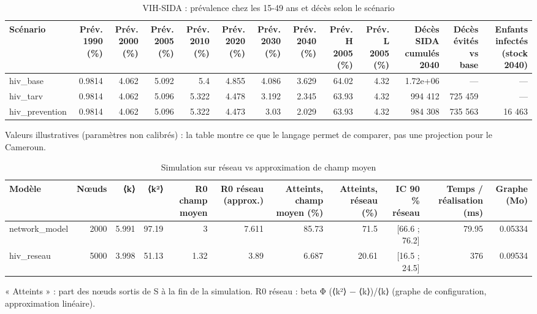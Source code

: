 \begin{table}[htbp]
\centering
\small
\caption{VIH-SIDA : prévalence chez les 15-49 ans et décès selon le scénario}
\label{tab:bench-b4}
\begin{tabular}{lrrrrrrrrrrrr}
\toprule
Scénario & Prév. 1990 (\%) & Prév. 2000 (\%) & Prév. 2005 (\%) & Prév. 2010 (\%) & Prév. 2020 (\%) & Prév. 2030 (\%) & Prév. 2040 (\%) & Prév. H 2005 (\%) & Prév. L 2005 (\%) & Décès SIDA cumulés 2040 & Décès évités vs base & Enfants infectés (stock 2040) \\
\midrule
hiv\_base & 0.9814 & 4.062 & 5.092 & 5.4 & 4.855 & 4.086 & 3.629 & 64.02 & 4.32 & 1.72e+06 & — & — \\
hiv\_tarv & 0.9814 & 4.062 & 5.096 & 5.322 & 4.478 & 3.192 & 2.345 & 63.93 & 4.32 & 994 412 & 725 459 & — \\
hiv\_prevention & 0.9814 & 4.062 & 5.096 & 5.322 & 4.473 & 3.03 & 2.029 & 63.93 & 4.32 & 984 308 & 735 563 & 16 463 \\
\bottomrule
\end{tabular}
\par\smallskip\footnotesize Valeurs illustratives (paramètres non calibrés) : la table montre ce que le langage permet de comparer, pas une projection pour le Cameroun.
\end{table}

\begin{table}[htbp]
\centering
\small
\caption{Simulation sur réseau vs approximation de champ moyen}
\label{tab:bench-b5}
\begin{tabular}{lrrrrrrrrrr}
\toprule
Modèle & Nœuds & ⟨k⟩ & ⟨k²⟩ & R0 champ moyen & R0 réseau (approx.) & Atteints, champ moyen (\%) & Atteints, réseau (\%) & IC 90 \% réseau & Temps / réalisation (ms) & Graphe (Mo) \\
\midrule
network\_model & 2000 & 5.991 & 97.19 & 3 & 7.611 & 85.73 & 71.5 & [66.6 ; 76.2] & 79.95 & 0.05334 \\
hiv\_reseau & 5000 & 3.998 & 51.13 & 1.32 & 3.89 & 6.687 & 20.61 & [16.5 ; 24.5] & 376 & 0.09534 \\
\bottomrule
\end{tabular}
\par\smallskip\footnotesize « Atteints » : part des nœuds sortis de S à la fin de la simulation. R0 réseau : beta Φ (⟨k²⟩ − ⟨k⟩)/⟨k⟩ (graphe de configuration, approximation linéaire).
\end{table}

